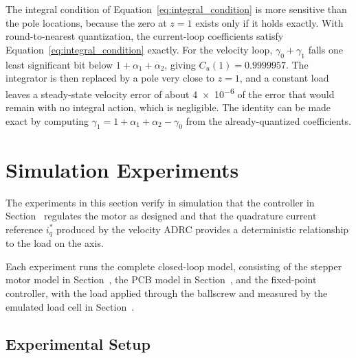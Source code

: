 The integral condition of Equation~\eqref{eq:integral_condition} is more sensitive than the pole locations, because the zero at $z = 1$ exists only if it holds exactly. With round-to-nearest quantization, the current-loop coefficients satisfy Equation~\eqref{eq:integral_condition} exactly. For the velocity loop, $\gamma_0 + \gamma_1$ falls one least significant bit below $1 + \alpha_1 + \alpha_2$, giving $C_u(1) = 0.9999957$. The integrator is then replaced by a pole very close to $z = 1$, and a constant load leaves a steady-state velocity error of about \num{4e-6} of the error that would remain with no integral action, which is negligible. The identity can be made exact by computing $\gamma_1 = 1 + \alpha_1 + \alpha_2 - \gamma_0$ from the already-quantized coefficients.


\section{Simulation Experiments}\label{sec:experiments}

The experiments in this section verify in simulation that the controller in Section~ regulates the motor as designed and that the quadrature current reference $i_q^{*}$ produced by the velocity ADRC provides a deterministic relationship to the load on the axis. 

 Each experiment runs the complete closed-loop model, consisting of the stepper motor model in Section~, the PCB model in Section~, and the fixed-point controller, with the load applied through the ballscrew and measured by the emulated load cell in Section~.

\subsection{Experimental Setup}\label{sec:expSetup}

